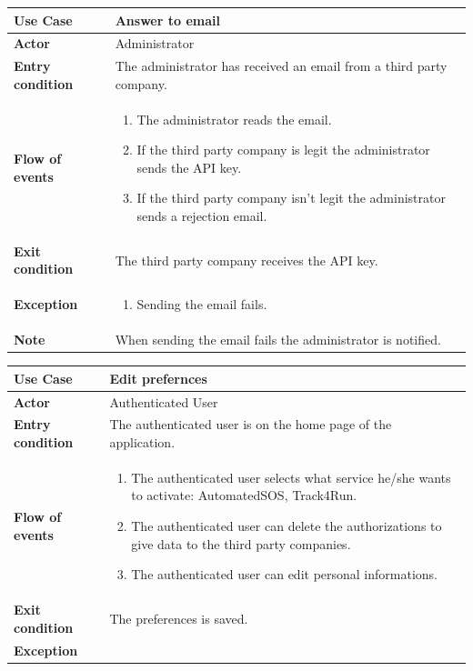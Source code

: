 \documentclass[../main.tex]{subfiles}
\begin{document}
	\begin{center}
		\begin{tabular}{p{3cm}p{8.28cm}}
			\hline
			\textbf{Use Case} & Answer to email\\
			\hline
			\textbf{Actor} & Administrator\\
			\hline
			\textbf{Entry condition} & The administrator has received an email from a third party company.\\
			\hline
			\textbf{Flow of events} & \begin{enumerate}
				\linespread{0}\item The administrator reads the email.
				\linespread{0}\item If the third party company is legit the administrator sends the API key.
				\linespread{0}\item If the third party company isn't legit the administrator sends a rejection email.
			\end{enumerate}\\
			\hline
			\textbf{Exit condition} & The third party company receives the API key.\\
			\hline
			\textbf{Exception} & \begin{enumerate}
				\linespread{0}\item Sending the email fails.
			\end{enumerate}\\
			\hline
			\textbf{Note} & When sending the email fails the administrator is notified.\\
			\hline
		\end{tabular}
	\end{center}
	\vspace*{3cm}
	\begin{center}
		\begin{tabular}{p{3cm}p{8.28cm}}
			\hline
			\textbf{Use Case} & Edit prefernces\\
			\hline
			\textbf{Actor} & Authenticated User\\
			\hline
			\textbf{Entry condition} & The authenticated user is on the home page of the application.\\
			\hline
			\textbf{Flow of events} & \begin{enumerate}
				\linespread{0}\item The authenticated user selects what service he/she wants to activate: AutomatedSOS, Track4Run.
				\linespread{0}\item The authenticated user can delete the authorizations to give data to the third party companies.
				\linespread{0}\item The authenticated user can edit personal informations.
			\end{enumerate}\\
			\hline
			\textbf{Exit condition} & The preferences is saved.\\
			\hline
			\textbf{Exception}\\
			\hline
		\end{tabular}
	\end{center}
\end{document}
